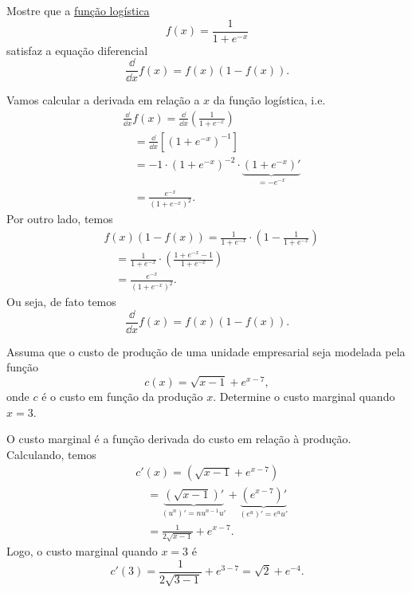 \begin{exeresol}
  Mostre que a \href{https://pt.wikipedia.org/wiki/Fun%C3%A7%C3%A3o_log%C3%ADstica}{função logística}
  \begin{equation}
    f(x) = \frac{1}{1+e^{-x}}
  \end{equation}
  satisfaz a equação diferencial
  \begin{equation}
    \frac{\dd}{\dd x}f(x) = f(x)(1-f(x)).
  \end{equation}
\end{exeresol}
\begin{resol}
  Vamos calcular a derivada em relação a $x$ da função logística, i.e.
  \begin{align}
    & \frac{\dd}{\dd x}f(x) = \frac{\dd}{\dd x}\left(\frac{1}{1+e^{-x}}\right) \\
    & \text{}\quad = \frac{\dd}{\dd x}\left[\left(1+e^{-x}\right)^{-1}\right] \\
    & \text{}\quad = -1\cdot\left(1+e^{-x}\right)^{-2}\cdot\underbrace{\left(1+e^{-x}\right)'}_{=-e^{-x}} \\
    & \text{}\quad = \frac{e^{-x}}{\left(1+e^{-x}\right)^{2}}.
  \end{align}
  Por outro lado, temos
  \begin{align}
    & f(x)(1-f(x)) = \frac{1}{1+e^{-x}}\cdot\left(1 - \frac{1}{1+e^{-x}}\right) \\
    & \text{}\quad = \frac{1}{1+e^{-x}}\cdot\left(\frac{1+e^{-x}-1}{1+e^{-x}}\right) \\
    & \text{}\quad = \frac{e^{-x}}{\left(1+e^{-x}\right)^{2}}.
  \end{align}
  Ou seja, de fato temos
  \begin{equation}
    \frac{\dd}{\dd x}f(x) = f(x)(1-f(x)).
  \end{equation}  
\end{resol}

\begin{exeresol}
  Assuma que o custo de produção de uma unidade empresarial seja modelada pela função
  \begin{equation}
    c(x) = \sqrt{x-1} + e^{x-7},
  \end{equation}
  onde $c$ é o custo em função da produção $x$. Determine o custo marginal quando $x=3$.
\end{exeresol}
\begin{resol}
  O custo marginal é a função derivada do custo em relação à produção. Calculando, temos
  \begin{align}
    & c'(x) = \left(\sqrt{x-1} + e^{x-7}\right)\\
    & \text{}\quad = \underbrace{\left(\sqrt{x-1}\right)'}_{(u^n)' = nu^{n-1}u'} + \underbrace{\left(e^{x-7}\right)'}_{(e^u)' = e^uu'}\\
    & \text{}\quad = \frac{1}{2\sqrt{x-1}} + e^{x-7}.
  \end{align}
  Logo, o custo marginal quando $x=3$ é
  \begin{equation}
    c'(3) = \frac{1}{2\sqrt{3-1}} + e^{3-7} = \sqrt{2} + e^{-4}.
  \end{equation}
\end{resol}

